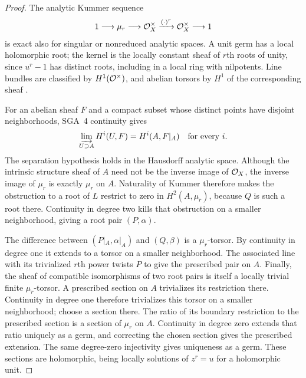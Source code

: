 \begin{proof}
The analytic Kummer sequence
\[
 1\longrightarrow\mu_r\longrightarrow\mathcal O_X^\times
 \xrightarrow{(\cdot)^r}\mathcal O_X^\times\longrightarrow1
\]
is exact also for singular or nonreduced analytic spaces.  A unit germ
has a local holomorphic root; the kernel is the locally constant sheaf
of \(r\)th roots of unity, since \(u^r-1\) has distinct roots, including
in a local ring with nilpotents.  Line bundles are classified by
\(H^1(\mathcal O^\times)\), and abelian torsors by \(H^1\) of the corresponding
sheaf \cite[Tags~09NU and~02FQ]{StacksProject}.

For an abelian sheaf \(F\) and a compact subset whose distinct points
have disjoint neighborhoods, SGA~4 continuity
\cite[Expos\'e~Vbis, Lemma~4.1.3]{SGA4Continuity} gives
\begin{equation}\label{eq:compact-continuity}
 \varinjlim_{U\supset A}H^i(U,F)=H^i(A,F|_A)
 \quad\text{for every }i.
\end{equation}
The separation hypothesis holds in the Hausdorff analytic space.  Although
the intrinsic structure sheaf of \(A\) need not be the inverse image of
\(\mathcal O_X\), the inverse image of \(\mu_r\) is exactly \(\mu_r\) on \(A\).
Naturality of Kummer therefore makes the obstruction to a root of \(L\)
restrict to zero in \(H^2(A,\mu_r)\), because \(Q\) is such a root there.
Continuity in degree two kills that obstruction on a smaller neighborhood,
giving a root pair \((P,\alpha)\).

The difference between \((P|_A,\alpha|_A)\) and \((Q,\beta)\) is a
\(\mu_r\)-torsor.  By continuity in degree one it extends to a torsor on
a smaller neighborhood.  The associated line with its trivialized
\(r\)th power twists \(P\) to give the prescribed pair on \(A\).
Finally, the sheaf of compatible isomorphisms of two root pairs is itself
a locally trivial finite \(\mu_r\)-torsor.  A prescribed section on \(A\)
trivializes its restriction there.  Continuity in degree one therefore
trivializes this torsor on a smaller neighborhood; choose a section there.
The ratio of its boundary restriction to the prescribed section is a
section of \(\mu_r\) on \(A\).  Continuity in degree zero extends that
ratio uniquely as a germ, and correcting the chosen section gives the
prescribed extension.  The same degree-zero injectivity gives uniqueness
as a germ.  These sections are holomorphic, being locally solutions of
\(z^r=u\) for a holomorphic unit.
\end{proof}

